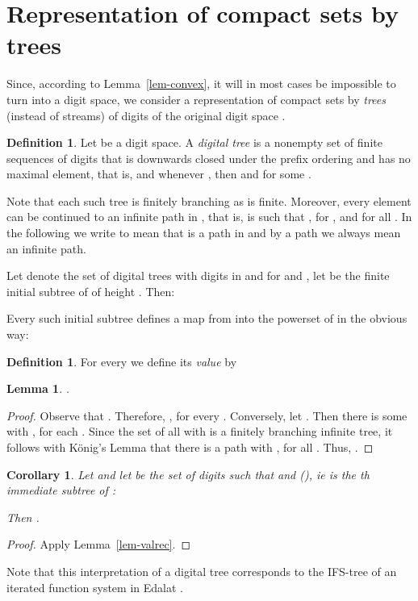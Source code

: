 \documentclass[microtype]{jloganal}
\theoremstyle{plain}
\newtheorem{lemma}[theorem]{Lemma}
\newtheorem{corollary}[theorem]{Corollary}
\theoremstyle{definition}
\newtheorem{definition}[theorem]{Definition}
\begin{document}
\section{Representation of compact sets by trees} 
\label{sec-tree}
Since, according to Lemma~\ref{lem-convex}, it will in most cases be 
impossible to turn  into a digit space, we consider a 
representation of compact sets by \emph{trees} (instead of streams) 
of digits of the original digit space .
\begin{definition}
\label{def-tree}
Let  be a digit space. A \emph{digital tree} is a nonempty set 
 of finite sequences of digits that 
is downwards closed under the prefix ordering and has no maximal element, that is,
 and whenever
, then  and
 for some .
\end{definition}
Note that each such tree is finitely branching as  is finite.
Moreover, every element  can be continued to an 
infinite path  in , that is,  is such that , for , and 
 for all .
In the following we write   to mean that  is a 
path in  and by a path we always mean an infinite path.

Let  denote the set of digital trees with digits in  and for  and , let  be the finite initial subtree of  of height . Then: 

Every such initial subtree defines a map  from  into the powerset of  in the obvious way:


\begin{definition}
\label{def-val}
For every  we define its \emph{value} by

\end{definition}

\begin{lemma}
\label{lem-semT}
.
\end{lemma}
\begin{proof}
Observe that . Therefore, , for every . 
Conversely, let . Then there is some  with , for each . Since the set of all  with  is a finitely branching infinite tree, it follows with K\"onig's Lemma that there is a path  with , for all . Thus, .
\end{proof}

\begin{corollary}\label{cor-tree-valrec}
Let  and let  be the set of digits 
such that  and  
(),
ie  is the th  immediate subtree of :

Then .
\end{corollary}
\begin{proof}
Apply Lemma~\ref{lem-valrec}.
\end{proof}
Note that this interpretation of a digital tree corresponds to the IFS-tree
of an iterated function system in Edalat \cite{Edalat97}.
\end{document}
